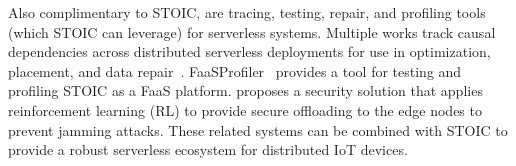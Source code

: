 Also complimentary to STOIC, are tracing, testing, repair, and profiling tools (which STOIC can leverage) for serverless systems. Multiple works track causal dependencies across distributed serverless deployments for use in optimization, placement, and data repair~\cite{ref:repairdata,deptracing19,gammaray17,aws-xray}. FaaSProfiler~\cite{ref:profile} provides a tool for testing and profiling STOIC as a FaaS platform. \cite{ref:security} proposes a security solution that applies reinforcement learning (RL) to provide secure offloading to the edge nodes to prevent jamming attacks. These related systems can be combined with STOIC to provide a robust serverless ecosystem for distributed IoT devices.

